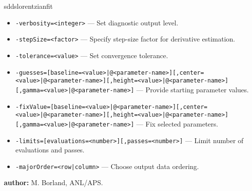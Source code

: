 \begin{sddsprog}{sddslorentzianfit}
\begin{itemize}
      \item \verb|-verbosity=<integer>| --- Set diagnostic output level.
      \item \verb|-stepSize=<factor>| --- Specify step-size factor for derivative estimation.
      \item \verb|-tolerance=<value>| --- Set convergence tolerance.
      \item \verb!-guesses=[baseline=<value>|@<parameter-name>][,center=<value>|@<parameter-name>][,height=<value>|@<parameter-name>][,gamma=<value>|@<parameter-name>]! --- Provide starting parameter values.
      \item \verb!-fixValue=[baseline=<value>|@<parameter-name>][,center=<value>|@<parameter-name>][,height=<value>|@<parameter-name>][,gamma=<value>|@<parameter-name>]! --- Fix selected parameters.
      \item \verb|-limits=[evaluations=<number>][,passes=<number>]| --- Limit number of evaluations and passes.
      \item \verb!-majorOrder=<row|column>! --- Choose output data ordering.
    \end{itemize}
  \item \textbf{author:} M. Borland, ANL/APS.
\end{sddsprog}
